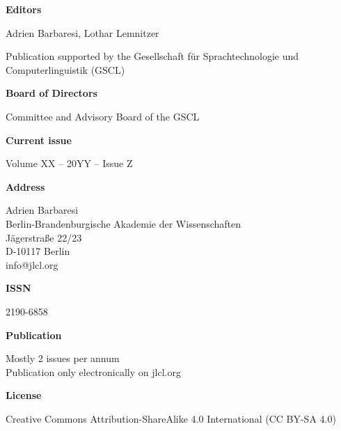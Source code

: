 \documentclass{jlcl}
\begin{document}
	

\vspace*{\fill}


\textbf{Editors}

Adrien Barbaresi, Lothar Lemnitzer

Publication supported by the Gesellschaft für Sprachtechnologie und
Computerlinguistik (GSCL)

\bigskip

\textbf{Board of Directors}

Committee and Advisory Board of the GSCL

\bigskip

\textbf{Current issue}

Volume XX – 20YY – Issue Z

\bigskip




\textbf{Address}

Adrien Barbaresi\\
Berlin-Brandenburgische Akademie der
Wissenschaften\\
Jägerstraße 22/23\\
D-10117 Berlin\\
info@jlcl.org

\bigskip

\textbf{ISSN}

2190-6858

\bigskip

\textbf{Publication}

Mostly 2 issues per annum\\
Publication only electronically on jlcl.org

\bigskip

\textbf{License}

Creative Commons Attribution-ShareAlike 4.0 International (CC BY-SA 4.0)

\vspace*{\fill}
\end{document}
